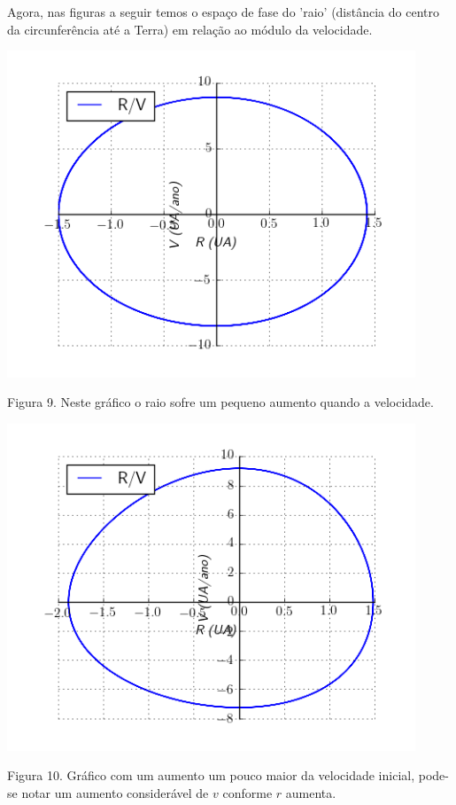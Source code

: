 \documentclass[a4paper]{article} %
\begin{document}
Agora, nas figuras a seguir temos o espaço de fase do 'raio' (distância do centro da circunferência até a Terra) em relação ao módulo da velocidade. 

\begin{center}
	\includegraphics[width=4.80in,height=3.84in, keepaspectratio=false]{image2_15-51-24-116000.png}
	
	\scriptsize {Figura 9. Neste gráfico o raio sofre um pequeno aumento quando a velocidade.}
\end{center}

\begin{center}
	\includegraphics[width=4.80in,height=3.84in, keepaspectratio=false]{image3_15-51-18-639000.png}
	
	\scriptsize {Figura 10. Gráfico com um aumento um pouco maior da velocidade inicial, pode-se notar um aumento considerável de $v$ conforme $r$ aumenta.}
\end{center}
\end{document}
